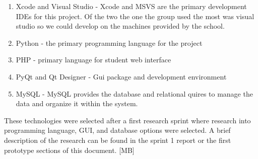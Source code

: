 \begin{enumerate}
\item Xcode and Visual Studio - Xcode and MSVS are the primary development IDEs for this project. Of the two the one the group used the most was visual studio so we could develop on the machines provided by the school.
\item Python - the primary programming language for the project
\item PHP - primary language for student web interface
\item PyQt and Qt Designer - Gui package and development environment 
\item MySQL - MySQL provides the database and relational quires to manage the data and organize it within the system.
\end{enumerate}


These technologies were selected after a first research sprint where research into programming language, GUI, and database options were selected. A brief description of the research can be found in the sprint 1 report or the first prototype sections of this document. [MB]